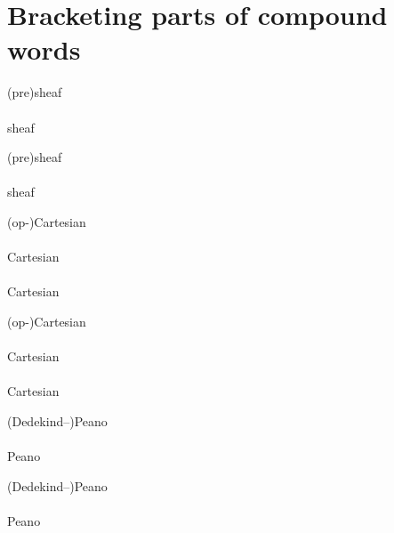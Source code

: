 \documentclass{article}
\begin{document}
\section{Bracketing parts of compound words}

\begin{verbatim*}
\begin{minipage}{0pt}
(pre)sheaf\\\\
sheaf\\
\end{minipage}
\end{verbatim*}
%
\begin{minipage}{0pt}
  (pre)sheaf\\\\
  sheaf\\
\end{minipage}

\begin{verbatim*}
\begin{minipage}{0pt}
(op-)Cartesian\\\\
Cartesian\\\\
Cartesian\\
\end{minipage}
\end{verbatim*}
%
\begin{minipage}{0pt}
  (op-)Cartesian\\\\
  Cartesian\\\\
  Cartesian\\
\end{minipage}

\begin{verbatim*}
\begin{minipage}{0pt}
(Dedekind--)Peano\\\\
Peano\\
\end{minipage}
\end{verbatim*}
%
\begin{minipage}{0pt}
  (Dedekind--)Peano\\\\
  Peano\\
\end{minipage}
\end{document}
